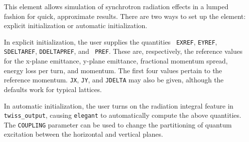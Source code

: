 This element allows simulation of synchrotron radiation effects in a
lumped fashion for quick, approximate results.  There are two ways to
set up the element: explicit initialization or automatic
initialization.  

In explicit initialization, the user supplies the quantities {\tt
EXREF}, {\tt EYREF}, {\tt SDELTAREF}, {\tt DDELTAPREF}, and {\tt
PREF}.  These are, respectively, the reference values for the x-plane
emittance, y-plane emittance, fractional momentum spread, energy loss
per turn, and momentum.  The first four values pertain to the
reference momentum.  {\tt JX}, {\tt JY}, and {\tt JDELTA} may also
be given, although the defaults work for typical lattices.

In automatic initialization, the user turns on the radiation integral
feature in {\tt twiss\_output}, causing {\tt elegant} to automatically
compute the above quantities.  The {\tt COUPLING} parameter can be used
to change the partitioning of quantum excitation between the horizontal
and vertical planes.
